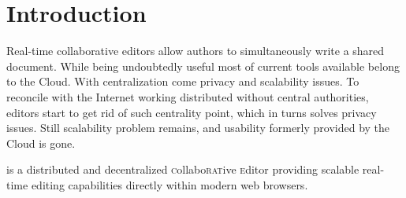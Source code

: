 
\section{Introduction}
\label{sec:introduction}

Real-time collaborative editors allow authors to simultaneously write a shared
document. While being undoubtedly useful most of current tools available belong
to the Cloud. With centralization come privacy and scalability issues. To
reconcile with the Internet working distributed without central authorities,
editors start to get rid of such centrality point, which in turns solves privacy
issues. Still scalability problem remains, and usability formerly provided by
the Cloud is gone.

\CRATE is a distributed and decentralized \textsc{c}ollabo\textsc{rat}ive
\textsc{e}ditor providing scalable real-time editing capabilities directly
within modern web browsers.
